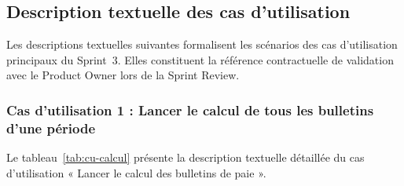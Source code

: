 \subsection{Description textuelle des cas d'utilisation}

Les descriptions textuelles suivantes formalisent les scénarios des
cas d'utilisation principaux du Sprint~3. Elles constituent la
référence contractuelle de validation avec le Product Owner lors de
la Sprint Review.
\subsubsection{Cas d'utilisation 1 : Lancer le calcul de tous les bulletins d'une période}

Le tableau~\ref{tab:cu-calcul} présente la description textuelle détaillée
du cas d'utilisation « Lancer le calcul des bulletins de paie ».
\mbox{}\\

